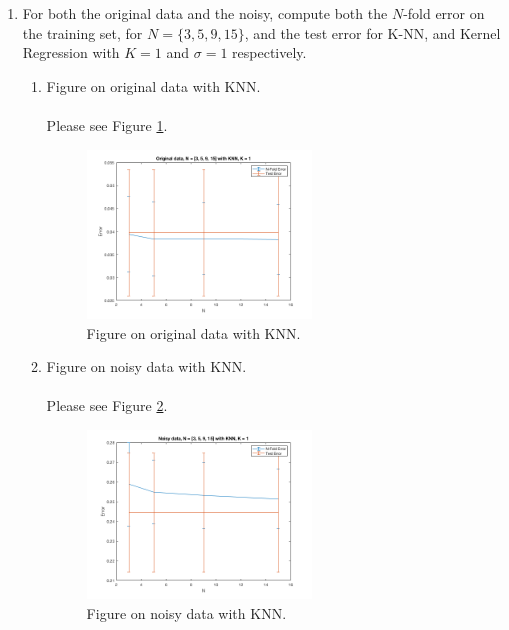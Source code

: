 \documentclass[english]{article}
\begin{document}
\begin{enumerate}[label=(\roman*)]
    \item For both the original data and the noisy, compute both the $N$-fold error on the training set, for $N = \{3, 5, 9, 15\}$, and the test error for K-NN, and Kernel Regression with $K = 1$ and $\sigma = 1$ respectively.
    \begin{enumerate}
        \item Figure on original data with KNN.\\ \\
        Please see Figure \ref{fig:211}. \\
        \begin{figure}[H]
          \centering
          \includegraphics[width=0.6\textwidth]{211.png}
          \caption{Figure on original data with KNN.}
          \label{fig:211}
        \end{figure}
        \item Figure on noisy data with KNN.\\ \\
        Please see Figure \ref{fig:212}. \\
        \begin{figure}[H]
          \centering
          \includegraphics[width=0.6\textwidth]{212.png}
          \caption{Figure on noisy data with KNN.}
          \label{fig:212}

\end{figure}
\end{enumerate}
\end{enumerate}
\end{document}
